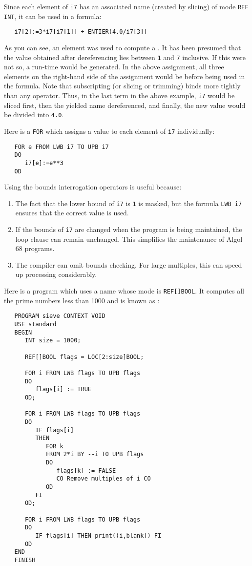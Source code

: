 Since each element of \verb|i7| has an associated name (created by
slicing) of mode \verb|REF INT|, it can be used in a formula:
\begin{verbatim}
   i7[2]:=3*i7[i7[1]] + ENTIER(4.0/i7[3])
\end{verbatim}
\noindent
As you can see, an element was used to compute a . It
has been presumed that the value obtained after dereferencing lies
between \verb|1| and \verb|7| inclusive. If this were not so, a
run-time  would be generated. In the
above assignment, all three elements on the right-hand side of the
assignment would be 
before being used in the formula.  Note that subscripting (or slicing
or trimming) binds more tightly than any operator.  Thus, in the last
term in the above example, \verb|i7| would be sliced first, then the
yielded name dereferenced, and finally, the new value would be
divided into \verb|4.0|.

Here is a \verb|FOR|  which assigns a value to
each element of \verb|i7| individually:
\begin{verbatim}
   FOR e FROM LWB i7 TO UPB i7
   DO
      i7[e]:=e**3
   OD
\end{verbatim}
\noindent
Using the bounds interrogation operators is useful because:
\begin{enumerate}
\item The fact that the lower bound of \verb|i7| is \verb|1| is
masked, but the formula \verb|LWB i7| ensures that the
correct value is used.
\item If the bounds of \verb|i7| are changed when the program is
being maintained, the loop clause can remain unchanged. This simplifies
the maintenance of Algol 68 programs.
\item The compiler can omit bounds checking. For large multiples,
this can speed up processing considerably.
\end{enumerate}

Here is a program which uses a name whose mode is\linebreak
\verb|REF[]BOOL|. It computes all the prime numbers less than 1000
and is known as :
\begin{verbatim}
   PROGRAM sieve CONTEXT VOID
   USE standard
   BEGIN
      INT size = 1000;

      REF[]BOOL flags = LOC[2:size]BOOL;

      FOR i FROM LWB flags TO UPB flags
      DO
         flags[i] := TRUE
      OD;

      FOR i FROM LWB flags TO UPB flags
      DO
         IF flags[i]
         THEN
            FOR k
            FROM 2*i BY --i TO UPB flags
            DO
               flags[k] := FALSE
               CO Remove multiples of i CO
            OD
         FI
      OD;

      FOR i FROM LWB flags TO UPB flags
      DO
         IF flags[i] THEN print((i,blank)) FI
      OD
   END
   FINISH
\end{verbatim}

